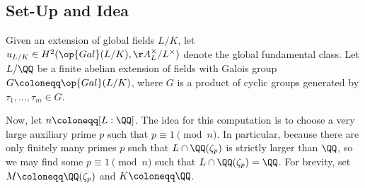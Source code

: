 
\subsection{Set-Up and Idea}
Given an extension of global fields $L/K$, let $u_{L/K}\in H^2(\op{Gal}(L/K),\AA_L^\times/L^\times)$ denote the global fundamental class. Let $L/\QQ$ be a finite abelian extension of fields with Galois group $G\coloneqq\op{Gal}(L/K)$, where $G$ is a product of cyclic groups generated by $\tau_1,\ldots,\tau_m\in G$.

Now, let $n\coloneqq[L:\QQ]$. The idea for this computation is to choose a very large auxiliary prime $p$ such that $p\equiv1\pmod n$. In particular, because there are only finitely many primes $p$ such that $L\cap\QQ(\zeta_p)$ is strictly larger than $\QQ$, so we may find some $p\equiv1\pmod n$ such that $L\cap\QQ(\zeta_p)=\QQ$. For brevity, set $M\coloneqq\QQ(\zeta_p)$ and $K\coloneqq\QQ$.

